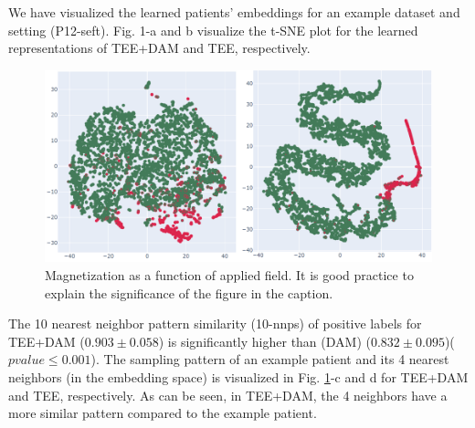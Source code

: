 \documentclass[journal,twoside,web]{ieeecolor}
\begin{document}
We have visualized the learned patients' embeddings for an example dataset and setting (P12-seft). Fig. 1-a and b visualize the t-SNE plot for the learned representations of TEE+DAM and TEE, respectively.     


\begin{figure}[!h]

    \centerline{\includegraphics{images/small_tsne.png}}
    \caption{Magnetization as a function of applied field.
    It is good practice to explain the significance of the figure in the caption.}
    \label{fig2}
\end{figure}

The 10 nearest neighbor pattern similarity (10-nnps) of positive labels for TEE+DAM ($0.903 \pm 0.058 $) is significantly higher than (DAM) ($0.832 \pm 0.095$)($pvalue \leq 0.001$). The sampling pattern of an example patient and its 4 nearest neighbors (in the embedding space) is visualized in Fig. \ref*{fig2}-c and d for TEE+DAM and TEE, respectively. As can be seen, in TEE+DAM, the 4 neighbors have a more similar pattern compared to the example patient. 
\end{document}
